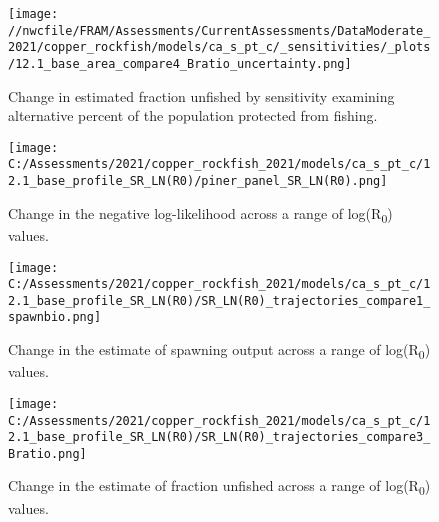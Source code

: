 \documentclass[11pt,
  english,
  a4paper,
]{article}
\begin{document}
\tagmcend\tagstructend


\begin{figure}
\centering
\texttt{[image: //nwcfile/FRAM/Assessments/CurrentAssessments/DataModerate\_2021/copper\_rockfish/models/ca\_s\_pt\_c/\_sensitivities/\_plots/12.1\_base\_area\_compare4\_Bratio\_uncertainty.png]}
\caption{Change in estimated fraction unfished by sensitivity examining alternative percent of the population protected from fishing.\label{fig:sens-area-depl}}
\end{figure}

\tagmcend\tagstructend

\newpage


\begin{figure}
\centering
\texttt{[image: C:/Assessments/2021/copper\_rockfish\_2021/models/ca\_s\_pt\_c/12.1\_base\_profile\_SR\_LN(R0)/piner\_panel\_SR\_LN(R0).png]}
\caption{Change in the negative log-likelihood across a range of log(R\textsubscript{0}) values.\label{fig:r0-profile}}
\end{figure}

\tagmcend\tagstructend


\begin{figure}
\centering
\texttt{[image: C:/Assessments/2021/copper\_rockfish\_2021/models/ca\_s\_pt\_c/12.1\_base\_profile\_SR\_LN(R0)/SR\_LN(R0)\_trajectories\_compare1\_spawnbio.png]}
\caption{Change in the estimate of spawning output across a range of log(R\textsubscript{0}) values.\label{fig:r0-ssb}}
\end{figure}

\tagmcend\tagstructend


\begin{figure}
\centering
\texttt{[image: C:/Assessments/2021/copper\_rockfish\_2021/models/ca\_s\_pt\_c/12.1\_base\_profile\_SR\_LN(R0)/SR\_LN(R0)\_trajectories\_compare3\_Bratio.png]}
\caption{Change in the estimate of fraction unfished across a range of log(R\textsubscript{0}) values.\label{fig:r0-depl}}
\end{figure}
\end{document}
